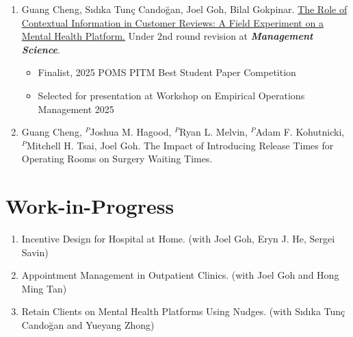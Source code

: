 \documentclass[12pt, a4paper]{article}
\begin{document}
{\begin{enumerate}[leftmargin=30pt, resume]
	
	\item Guang Cheng, S\i{}d\i{}ka Tun\c{c} Cando\u{g}an, Joel Goh, Bilal Gokpinar.
	\href{https://ssrn.com/abstract=4956298}{The Role of Contextual Information in Customer Reviews: A Field Experiment on a Mental Health Platform.} Under 2nd round revision at \textit{\textbf{Management Science}}.

	\begin{itemize}
		\item {\footnotesize Finalist, 2025 POMS PITM Best Student Paper Competition}
		\item {\footnotesize Selected for presentation at Workshop on Empirical Operations Management 2025}
	\end{itemize}

	\item Guang Cheng, $^P$Joshua M. Hagood, $^P$Ryan L. Melvin, $^P$Adam F. Kohutnicki, $^P$Mitchell H. Tsai, Joel Goh. The Impact of Introducing Release Times for Operating Rooms on Surgery Waiting Times.

\end{enumerate}




\section*{Work-in-Progress}

\begin{enumerate}[leftmargin=30pt, resume]

	\item Incentive Design for Hospital at Home. (with Joel Goh, Eryn J. He, Sergei Savin)
	
	\item Appointment Management in Outpatient Clinics. (with Joel Goh and Hong Ming Tan)
	
	\item Retain Clients on Mental Health Platforms Using Nudges. (with S\i{}d\i{}ka Tun\c{c} Cando\u{g}an and Yueyang Zhong) 
	
\end{enumerate}



}
\end{document}
